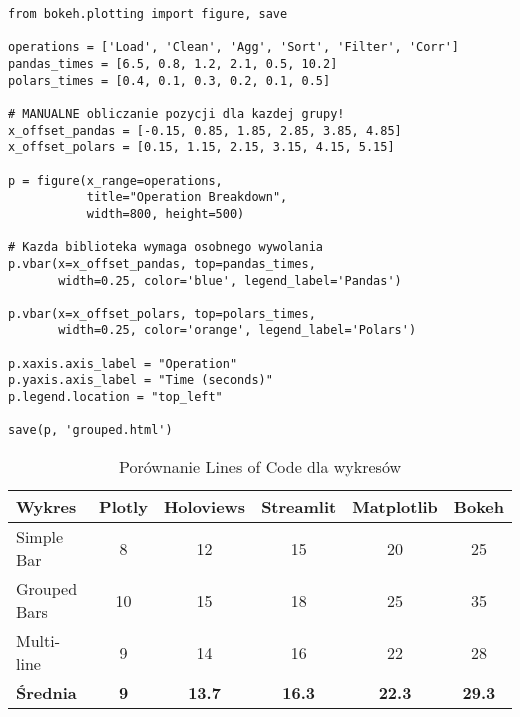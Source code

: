 


\begin{lstlisting}[caption={Bokeh - Grouped bars manualnie (35 LOC)},label={lst:bokeh_grouped}]
from bokeh.plotting import figure, save

operations = ['Load', 'Clean', 'Agg', 'Sort', 'Filter', 'Corr']
pandas_times = [6.5, 0.8, 1.2, 2.1, 0.5, 10.2]
polars_times = [0.4, 0.1, 0.3, 0.2, 0.1, 0.5]

# MANUALNE obliczanie pozycji dla kazdej grupy!
x_offset_pandas = [-0.15, 0.85, 1.85, 2.85, 3.85, 4.85]
x_offset_polars = [0.15, 1.15, 2.15, 3.15, 4.15, 5.15]

p = figure(x_range=operations, 
           title="Operation Breakdown",
           width=800, height=500)

# Kazda biblioteka wymaga osobnego wywolania
p.vbar(x=x_offset_pandas, top=pandas_times, 
       width=0.25, color='blue', legend_label='Pandas')
       
p.vbar(x=x_offset_polars, top=polars_times, 
       width=0.25, color='orange', legend_label='Polars')

p.xaxis.axis_label = "Operation"
p.yaxis.axis_label = "Time (seconds)"
p.legend.location = "top_left"

save(p, 'grouped.html')
\end{lstlisting}




\begin{table}[h]
\centering
\caption{Porównanie Lines of Code dla wykresów}
\label{tab:loc_comparison}
\begin{tabular}{|l|c|c|c|c|c|}
\hline
\textbf{Wykres} & \textbf{Plotly} & \textbf{Holoviews} & \textbf{Streamlit} & \textbf{Matplotlib} & \textbf{Bokeh} \\
\hline
Simple Bar & 8 & 12 & 15 & 20 & 25 \\
Grouped Bars & 10 & 15 & 18 & 25 & 35 \\
Multi-line & 9 & 14 & 16 & 22 & 28 \\
\hline
\textbf{Średnia} & \textbf{9} & \textbf{13.7} & \textbf{16.3} & \textbf{22.3} & \textbf{29.3} \\
\hline
\end{tabular}
\end{table}


